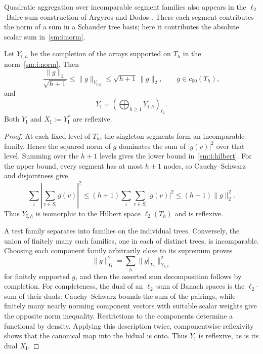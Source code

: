Quadratic aggregation over incomparable segment families also appears
in the $\ell_2$-Baire-sum construction of Argyros and Dodos
\cite[author version, Section~4.1]{ArgyrosDodos2007}. There each segment
contributes the norm of a sum in a Schauder tree basis; here it contributes
the absolute scalar sum in~\eqref{sm:i:norm}.

\begin{proposition}\label{sm:i:reflexivity}
Let $Y_{\mathrm I,h}$ be the completion of the arrays supported on $T_h$
in the norm~\eqref{sm:i:norm}.  Then
\begin{equation}
 \frac{\|g\|_2}{\sqrt{h+1}}
 \leq\|g\|_{Y_{\mathrm I,h}}
 \leq\sqrt{h+1}\,\|g\|_2,
 \qquad g\in c_{00}(T_h),
 \label{sm:i:hilbert}
\end{equation}
and
\[
 Y_{\mathrm I}=\left(\bigoplus_{h\geq1}Y_{\mathrm I,h}\right)_{\ell_2}.
\]
Both $Y_{\mathrm I}$ and $X_{\mathrm I}:=Y_{\mathrm I}^*$ are reflexive.
\end{proposition}

\begin{proof}
At each fixed level of $T_h$, the singleton segments form an incomparable
family.  Hence the squared norm of $g$ dominates the sum of $|g(v)|^2$
over that level.  Summing over the $h+1$ levels gives the lower bound
in~\eqref{sm:i:hilbert}.  For the upper bound, every segment has at most
$h+1$ nodes, so Cauchy--Schwarz and disjointness give
\[
 \sum_i\left|\sum_{v\in S_i}g(v)\right|^2
 \leq(h+1)\sum_i\sum_{v\in S_i}|g(v)|^2
 \leq(h+1)\|g\|_2^2.
\]
Thus $Y_{\mathrm I,h}$ is isomorphic to the Hilbert space $\ell_2(T_h)$
and is reflexive.

A test family separates into families on the individual trees.  Conversely,
the union of finitely many such families, one in each of distinct trees,
is incomparable.  Choosing each component family arbitrarily close to
its supremum proves
\[
 \|g\|_{Y_{\mathrm I}}^2
 =\sum_h\|g|_{T_h}\|_{Y_{\mathrm I,h}}^2
\]
for finitely supported $g$, and then the asserted sum decomposition
follows by completion.
For completeness, the dual of an $\ell_2$-sum of Banach spaces is the
$\ell_2$-sum of their duals: Cauchy--Schwarz bounds the sum of the
pairings, while finitely many nearly norming component vectors with
suitable scalar weights give the opposite norm inequality.  Restrictions
to the components determine a functional by density.  Applying this
description twice, componentwise reflexivity shows that the canonical
map into the bidual is onto.  Thus $Y_{\mathrm I}$ is reflexive, as is
its dual $X_{\mathrm I}$.
\end{proof}

